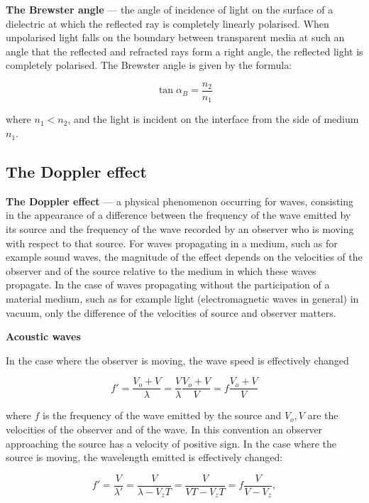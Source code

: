 \textbf{The Brewster angle} --- the angle of incidence of light on the surface of a dielectric at which the reflected ray is completely linearly polarised. When unpolarised light falls on the boundary between transparent media at such an angle that the reflected and refracted rays form a right angle, the reflected light is completely polarised. The Brewster angle is given by the formula:

\begin{equation}
    \tan{\alpha_{B}} = \frac{n_{2}}{n_{1}}
\end{equation}

where $n_{1} < n_{2}$, and the light is incident on the interface from the side of medium $n_{1}$.

\subsection{The Doppler effect}

\textbf{The Doppler effect} --- a physical phenomenon occurring for waves, consisting in the appearance of a difference between the frequency of the wave emitted by its source and the frequency of the wave recorded by an observer who is moving with respect to that source. For waves propagating in a medium, such as for example sound waves, the magnitude of the effect depends on the velocities of the observer and of the source relative to the medium in which these waves propagate. In the case of waves propagating without the participation of a material medium, such as for example light (electromagnetic waves in general) in vacuum, only the difference of the velocities of source and observer matters.

\textbf{Acoustic waves}

In the case where the observer is moving, the wave speed is effectively changed

\begin{equation}
    f' = \frac{V_{o} + V}{\lambda} = \frac{V}{\lambda}\frac{V_{o} + V}{V} = f\frac{V_{o} + V}{V}
\end{equation}

where $f$ is the frequency of the wave emitted by the source and $V_{o}, V$ are the velocities of the observer and of the wave. In this convention an observer approaching the source has a velocity of positive sign. In the case where the source is moving, the wavelength emitted is effectively changed:

\begin{equation}
    f' = \frac{V}{\lambda'} = \frac{V}{\lambda - V_{z}T} = \frac{V}{VT - V_{z}T} = f\frac{V}{V - V_{z}},
\end{equation}

